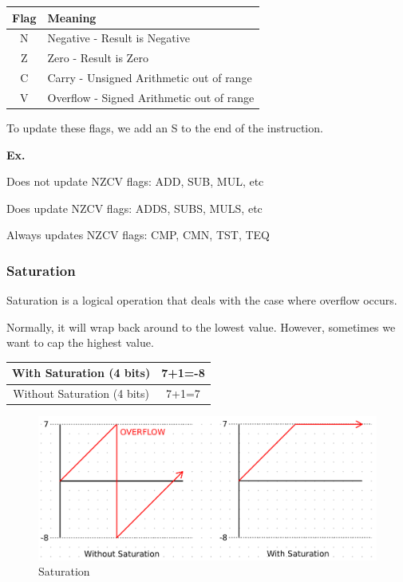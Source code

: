 \documentclass[12pt,letterpaper]{article} \usepackage{amsmath} \usepackage{graphicx} \usepackage[margin=1in]{geometry} \usepackage{longtable}  \usepackage{amssymb}
\begin{document}
	\begin{center}
		\begin{tabular}{|c||l|}
			\hline
			Flag & Meaning \\
			\hline\hline
			N & Negative - Result is Negative \\
			\hline
			Z & Zero - Result is Zero \\
			\hline
			C & Carry - Unsigned Arithmetic out of range \\
			\hline
			V & Overflow - Signed Arithmetic out of range \\
			\hline
		\end{tabular}
	\end{center}
	
	To update these flags, we add an S to the end of the instruction. 

	\begin{mdframed}
		\textbf{Ex. }
		
		Does not update NZCV flags: ADD, SUB, MUL, etc
		
		Does update NZCV flags: ADDS, SUBS, MULS, etc
		
		Always updates NZCV flags: CMP, CMN, TST, TEQ
	\end{mdframed}

	
	
	\subsubsection{Saturation}
	Saturation is a logical operation that deals with the case where overflow occurs. 
	
	Normally, it will wrap back around to the lowest value. However, sometimes we want to cap the highest value. 
	
	\begin{center}
		\begin{tabular}{|c|c|}
			\hline
			With Saturation (4 bits) & 7+1=-8 \\
			\hline
			Without Saturation (4 bits) & 7+1=7 \\
			\hline
		\end{tabular}
	\end{center}
	
	\begin{figure}[h!]
		\centering
		\includegraphics[width=0.7\linewidth]{images/saturation}
		\caption{Saturation}
		\label{fig:saturation}
	\end{figure}
	
\end{document}
